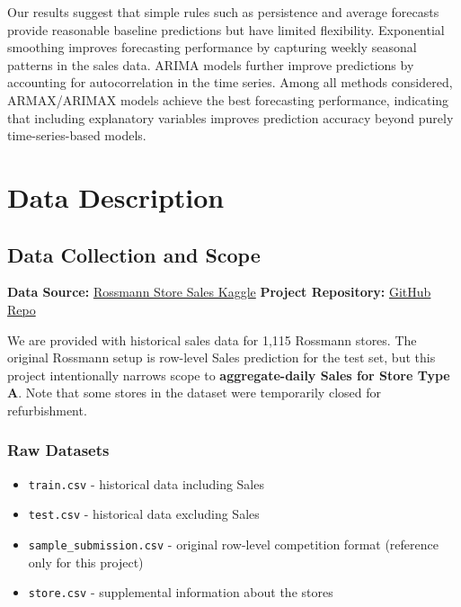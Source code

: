 \documentclass[
  12pt,
]{article}
\providecommand{\tightlist}{%
  \setlength{\itemsep}{0pt}\setlength{\parskip}{0pt}}
\begin{document}
Our results suggest that simple rules such as persistence and average
forecasts provide reasonable baseline predictions but have limited
flexibility. Exponential smoothing improves forecasting performance by
capturing weekly seasonal patterns in the sales data. ARIMA models
further improve predictions by accounting for autocorrelation in the
time series. Among all methods considered, ARMAX/ARIMAX models achieve
the best forecasting performance, indicating that including explanatory
variables improves prediction accuracy beyond purely time-series-based
models.

\section{Data Description}\label{data-description}

\subsection{Data Collection and Scope}\label{data-collection-and-scope}

\textbf{Data Source:}
\href{https://www.kaggle.com/c/rossmann-store-sales/data}{Rossmann Store
Sales \textbar{} Kaggle} \textbf{Project Repository:}
\href{https://github.com/samintisar/stat443-timeseries-project}{GitHub
Repo}

We are provided with historical sales data for 1,115 Rossmann stores.
The original Rossmann setup is row-level Sales prediction for the test
set, but this project intentionally narrows scope to
\textbf{aggregate-daily Sales for Store Type A}. Note that some stores
in the dataset were temporarily closed for refurbishment.

\subsubsection{Raw Datasets}\label{raw-datasets}

\begin{itemize}
\tightlist
\item
  \texttt{train.csv} - historical data including Sales
\item
  \texttt{test.csv} - historical data excluding Sales
\item
  \texttt{sample\_submission.csv} - original row-level competition
  format (reference only for this project)
\item
  \texttt{store.csv} - supplemental information about the stores
\end{itemize}
\end{document}
